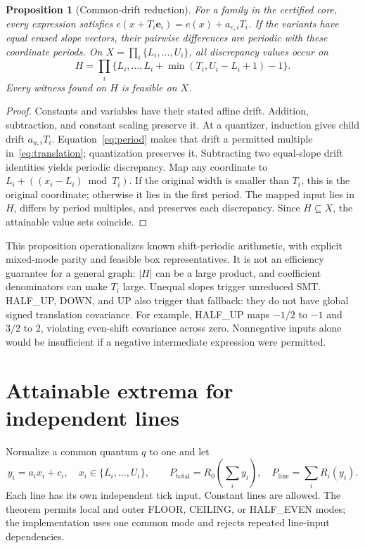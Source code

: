 \documentclass[11pt]{article}
\newtheorem{proposition}[theorem]{Proposition}
\begin{document}
\begin{proposition}[Common-drift reduction]\label{prop:period}
For a family in the certified core, every expression satisfies
$e(x+T_i\mathbf e_i)=e(x)+a_{e,i}T_i$.
If the variants have equal erased slope vectors, their pairwise differences are periodic with these coordinate periods. On $X=\prod_i\{L_i,\ldots,U_i\}$, all discrepancy values occur on
\[
 H=\prod_i\{L_i,\ldots,L_i+\min(T_i,U_i-L_i+1)-1\}.
\]
Every witness found on $H$ is feasible on $X$.
\end{proposition}
\begin{proof}
Constants and variables have their stated affine drift. Addition, subtraction, and constant scaling preserve it. At a quantizer, induction gives child drift $a_{u,i}T_i$. Equation~\eqref{eq:period} makes that drift a permitted multiple in~\eqref{eq:translation}; quantization preserves it. Subtracting two equal-slope drift identities yields periodic discrepancy. Map any coordinate to $L_i+((x_i-L_i)\bmod T_i)$. If the original width is smaller than $T_i$, this is the original coordinate; otherwise it lies in the first period. The mapped input lies in $H$, differs by period multiples, and preserves each discrepancy. Since $H\subseteq X$, the attainable value sets coincide.
\end{proof}

This proposition operationalizes known shift-periodic arithmetic, with explicit mixed-mode parity and feasible box representatives. It is not an efficiency guarantee for a general graph: $|H|$ can be a large product, and coefficient denominators can make $T_i$ large. Unequal slopes trigger unreduced SMT. HALF\_UP, DOWN, and UP also trigger that fallback: they do not have global signed translation covariance. For example, HALF\_UP maps $-1/2$ to $-1$ and $3/2$ to $2$, violating even-shift covariance across zero. Nonnegative inputs alone would be insufficient if a negative intermediate expression were permitted.

\section{Attainable extrema for independent lines}
Normalize a common quantum $q$ to one and let
\[
 y_i=a_i x_i+c_i,\quad x_i\in\{L_i,\ldots,U_i\},\qquad
 P_{\mathrm{total}}=R_0\!\left(\sum_i y_i\right),\quad
 P_{\mathrm{line}}=\sum_i R_i(y_i).
\]
Each line has its own independent tick input. Constant lines are allowed. The theorem permits local and outer FLOOR, CEILING, or HALF\_EVEN modes; the implementation uses one common mode and rejects repeated line-input dependencies.
\end{document}
